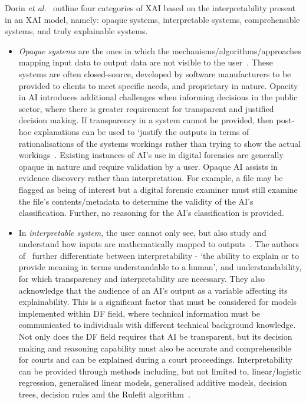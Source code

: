 Dorin {\em et al.}~\cite{doran17} outline four categories of XAI based
on the interpretability present in an XAI model, namely: opaque
systems, interpretable systems, comprehensible systems, and truly
explainable systems.

\begin{itemize}

\item \emph{Opaque systems} are the ones in which the mechanisms/algorithms/approaches mapping input data to output data are not visible to the user~\cite{doran17}. These systems are often closed-source, developed by software manufacturers to be provided to clients to meet specific needs, and proprietary in nature. Opacity in AI introduces additional challenges when informing decisions in the public sector, where there is greater requirement for transparent and justified decision making. If transparency in a system cannot be provided, then post-hoc explanations can be used to `justify the outputs in terms of rationalisations of the systems workings rather than trying to show the actual workings~\cite{Preece18}. Existing instances of AI’s use in digital forensics are generally opaque in nature and require validation by a user. Opaque AI assists in evidence discovery rather than interpretation. For example, a file may be flagged as being of interest but a digital forensic examiner must still examine the file’s contents/metadata to determine the validity of the AI’s classification. Further, no reasoning for the AI’s classification is provided.

\item In \emph{interpretable system}, the user cannot only see, but also study and understand how inputs are mathematically mapped to outputs~\cite{doran17}. The authors of~\cite{BARREDOARRIETA202082} further differentiate between interpretability - `the ability to explain or to provide meaning in terms understandable to a human', and understandability, for which transparency and interpretability are necessary. They also acknowledge that the audience of an AI’s output as a variable affecting its explainability. This is a significant factor that must be considered for models implemented within DF field, where technical information must be communicated to individuals with different technical background knowledge. Not only does the DF field requires that AI be transparent, but its decision making and reasoning capability must also be accurate and comprehensible for courts and can be explained during a court proceedings. Interpretability can be provided through methods including, but not limited to, linear/logistic regression, generalised linear models, generalised additive models, decision trees, decision rules and the Rulefit algorithm~\cite{Molnar20}.


\end{itemize}
